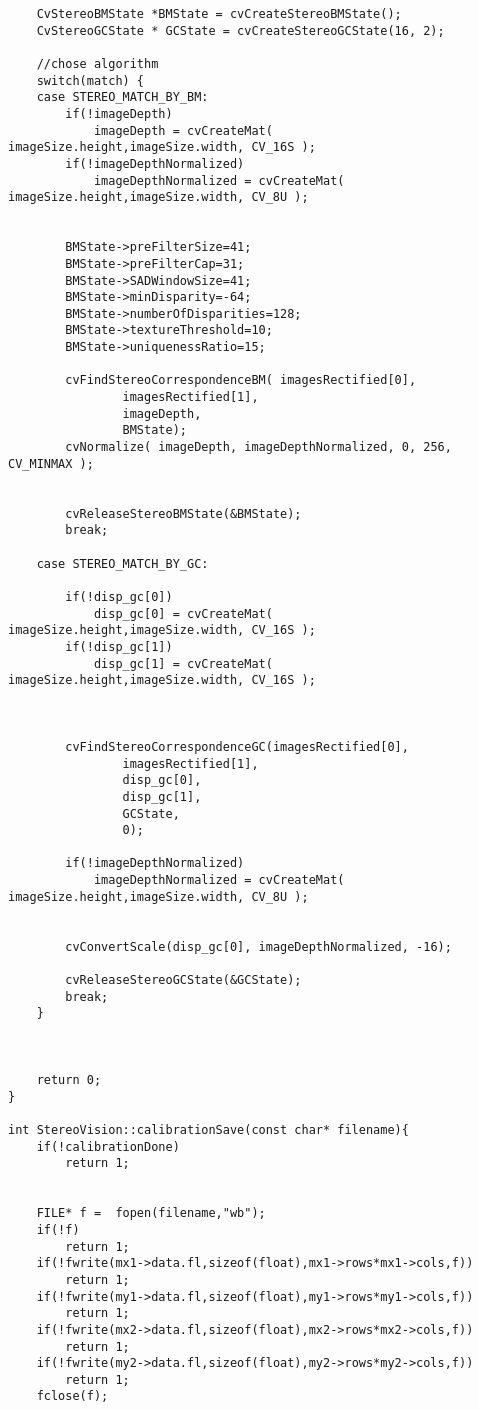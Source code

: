 \begin{lstlisting}
    CvStereoBMState *BMState = cvCreateStereoBMState();
    CvStereoGCState * GCState = cvCreateStereoGCState(16, 2);

    //chose algorithm
    switch(match) {
    case STEREO_MATCH_BY_BM:
    	if(!imageDepth)
   	    	imageDepth = cvCreateMat( imageSize.height,imageSize.width, CV_16S );
  	    if(!imageDepthNormalized)
   	    	imageDepthNormalized = cvCreateMat( imageSize.height,imageSize.width, CV_8U );


    	BMState->preFilterSize=41;
    	BMState->preFilterCap=31;
    	BMState->SADWindowSize=41;
    	BMState->minDisparity=-64;
    	BMState->numberOfDisparities=128;
    	BMState->textureThreshold=10;
    	BMState->uniquenessRatio=15;

    	cvFindStereoCorrespondenceBM( imagesRectified[0],
    			imagesRectified[1],
    			imageDepth,
    			BMState);
    	cvNormalize( imageDepth, imageDepthNormalized, 0, 256, CV_MINMAX );


    	cvReleaseStereoBMState(&BMState);
    	break;

    case STEREO_MATCH_BY_GC:

    	if(!disp_gc[0])
   	    	disp_gc[0] = cvCreateMat( imageSize.height,imageSize.width, CV_16S );
  	    if(!disp_gc[1])
   	    	disp_gc[1] = cvCreateMat( imageSize.height,imageSize.width, CV_16S );



  	    cvFindStereoCorrespondenceGC(imagesRectified[0],
  	    		imagesRectified[1],
  	    		disp_gc[0],
  	    		disp_gc[1],
  	    		GCState,
  	    		0);

  	    if(!imageDepthNormalized)
  	       	imageDepthNormalized = cvCreateMat( imageSize.height,imageSize.width, CV_8U );


  	    cvConvertScale(disp_gc[0], imageDepthNormalized, -16);

  	    cvReleaseStereoGCState(&GCState);
  	    break;
    }



    return 0;
}

int StereoVision::calibrationSave(const char* filename){
    if(!calibrationDone)
    	return 1;


    FILE* f =  fopen(filename,"wb");
    if(!f)
    	return 1;
    if(!fwrite(mx1->data.fl,sizeof(float),mx1->rows*mx1->cols,f))
    	return 1;
    if(!fwrite(my1->data.fl,sizeof(float),my1->rows*my1->cols,f))
    	return 1;
    if(!fwrite(mx2->data.fl,sizeof(float),mx2->rows*mx2->cols,f))
    	return 1;
    if(!fwrite(my2->data.fl,sizeof(float),my2->rows*my2->cols,f))
    	return 1;
    fclose(f);



\end{lstlisting}
